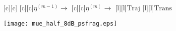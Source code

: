 \documentclass{article}
\begin{document}
\begin{figure}[htb]
  \begin{center}

        [c][c]{}
        [c][c]{$\eta^{(m-1)} \rightarrow$}
        [c][c]{$\eta^{(m)} \rightarrow$}
        [l][l]{$\mathrm{Traj}$}
        [l][l]{$\mathrm{Trans}$}
	

    \texttt{[image: mue\_half\_8dB\_psfrag.eps]}
    \end{center}
\end{figure}
\end{document}
